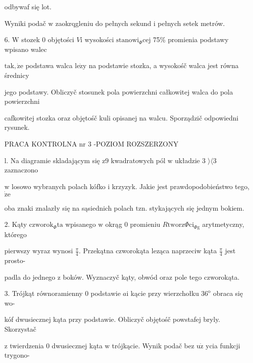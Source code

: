\documentclass[a4paper,12pt]{article}
\begin{document}
odbywaf się lot.

Wyniki podač $\mathrm{w}$ zaokrqgleniu do pełnych sekund $\mathrm{i}$ pełnych setek metrów.

6. $\mathrm{W}$ stozek $0$ objętości $V\mathrm{i}$ wysokości $\mathrm{s}\mathrm{t}\mathrm{a}\mathrm{n}\mathrm{o}\mathrm{w}\mathrm{i}_{\Phi}\mathrm{c}\mathrm{e}\mathrm{j}$ 75\% promienia podstawy wpisano walec

$\mathrm{t}\mathrm{a}\mathrm{k}, \dot{\mathrm{z}}\mathrm{e}$ podstawa walca $\mathrm{l}\mathrm{e}\dot{\mathrm{z}}\mathrm{y}$ na podstawie stozka, a wysokośč walca jest równa średnicy

jego podstawy. Obliczyč stosunek pola powierzchni całkowitej walca do pola powierzchni

cafkowitej stozka oraz objętośč kuli opisanej na walcu. Sporządzič odpowiedni rysunek.





PRACA KONTROLNA nr 3 -POZIOM ROZSZERZONY

l. Na diagramie skladającym się $\mathrm{z} 9$ kwadratowych pól $\mathrm{w}$ układzie 3 $\rangle\langle 3$ zaznaczono

$\mathrm{w}$ losowo wybranych polach kófko $\mathrm{i}$ krzyzyk. Jakie jest prawdopodobieństwo tego, $\dot{\mathrm{z}}\mathrm{e}$

oba znaki znalazły się na sąsiednich polach $\mathrm{t}\mathrm{z}\mathrm{n}$. stykających się jednym bokiem.

2. Kąty $\mathrm{c}\mathrm{z}\mathrm{w}\mathrm{o}\mathrm{r}\mathrm{o}\mathrm{k}_{\Phi}\mathrm{t}\mathrm{a}$ wpisanego $\mathrm{w}$ okrąg $0$ promieniu $R\mathrm{t}\mathrm{w}\mathrm{o}\mathrm{r}\mathrm{z}\Phi \mathrm{c}\mathrm{i}_{\Phi \mathrm{g}}$ arytmetyczny, którego

pierwszy wyraz wynosi $\displaystyle \frac{\pi}{4}$. Przekątna czworokąta leząca naprzeciw kąta $\displaystyle \frac{\pi}{4}$ jest prosto-

padla do jednego $\mathrm{z}$ boków. Wyznaczyč kąty, obwód oraz pole tego czworokąta.

3. Trójkąt równoramienny $0$ podstawie $a \mathrm{i}$ kącie przy wierzchołku $36^{\mathrm{o}}$ obraca się wo-

kóf dwusiecznej kąta przy podstawie. Obliczyč objętośč powstafej bryly. Skorzystač

$\mathrm{z}$ twierdzenia $0$ dwusiecznej kąta $\mathrm{w}$ trójkącie. Wynik podač bez $\mathrm{u}\dot{\mathrm{z}}$ ycia funkcji trygono-
\end{document}
